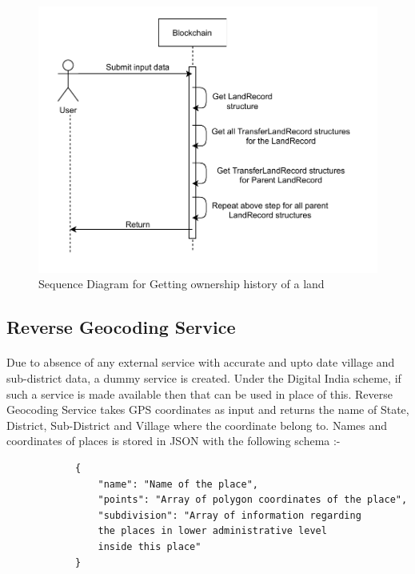 \documentclass{article}
\begin{document}
        \begin{figure}[htbp]
            \includegraphics[scale=0.25]{blockchain_seq_get_history}
            \centering
            \caption{Sequence Diagram for Getting ownership history of a land}
        \end{figure}
    
    \subsection{Reverse Geocoding Service}
        \paragraph{}
        Due to absence of any external service with accurate and upto date village and sub-district data, a dummy service is created. Under the Digital India scheme, if such a service is made available then that can be used in place of this. Reverse Geocoding Service takes GPS coordinates as input and returns the name of State, District, Sub-District and Village where the coordinate belong to. Names and coordinates of places is stored in JSON with the following schema :-

        \begin{listing}[H]
        \begin{verbatim}
            {     
                "name": "Name of the place",
                "points": "Array of polygon coordinates of the place",
                "subdivision": "Array of information regarding
                the places in lower administrative level
                inside this place"
            }
        \end{verbatim}
        \end{listing}
        
\end{document}
